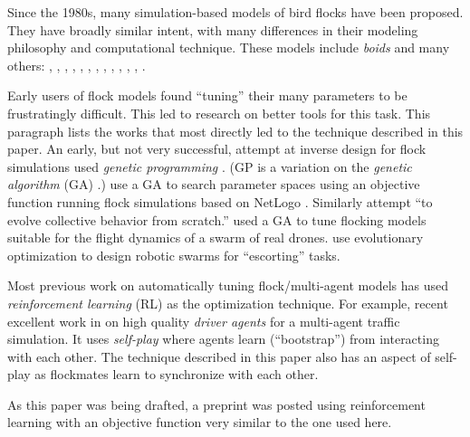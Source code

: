 \documentclass[letterpaper]{article}
\begin{document}
Since the 1980s, many simulation-based models of bird flocks have been proposed. They have broadly similar intent, with many differences in their modeling philosophy and computational technique. These models include \textit{boids} and many others:
\citet{aoki_simulation_1982}, 
\citet{akira_okubo_dynamical_1986}, 
\citet{reynolds_flocks_1987},
\citet{heppner_stochastic_1990}, 
\citet{tu_artificial_1994},
\citet{vicsek_novel_1995},
\citet{toner_flocks_1998}, 
\citet{bajec_simulating_2005},
\citet{cucker_emergent_2007},
\citet{moskon_fuzzy_2007},
\citet{cavagna_seventh_2008},
\citet{bajec_organized_2009},
\citet{bhattacharya_collective_2010}
\citet{vasarhelyi_optimized_2018}
\citet{hoetzlein_flock2_2024}.

Early users of flock models found ``tuning'' their many parameters to be frustratingly difficult. This led to research on better tools for this task. This paragraph lists the works that most directly led to the technique described in this paper. An early, but not very successful, attempt at inverse design for flock simulations \citep{reynolds_evolved_1993} used \textit{genetic programming} \citep{koza_genetic_1992}. (GP is a variation on the \textit{genetic algorithm} (GA) \citep{holland_adaptation_1975}.) \citet{stonedahl_finding_2011} use a GA to search parameter spaces using an objective function running flock simulations based on NetLogo \citep{tisue_netlogo_2004}. Similarly \citet{demsar_evolution_2017} attempt ``to evolve collective behavior from scratch.'' \citet{vasarhelyi_optimized_2018} used a GA to tune flocking models suitable for the flight dynamics of a swarm of real drones. \citet{stolfi_escorting_2025} use evolutionary optimization to design robotic swarms for ``escorting'' tasks.

Most previous work on automatically tuning flock/multi-agent models has used \textit{reinforcement learning} (RL) \citep{sutton_reinforcement_1998} as the optimization technique. For example, recent excellent work in \citet{cornelisse_building_2025} on high quality \textit{driver agents} for a multi-agent traffic simulation. It uses \textit{self-play} where agents learn (``bootstrap'') from interacting with each other. The technique described in this paper also has an aspect of self-play as flockmates learn to synchronize with each other.

As this paper was being drafted, a preprint was posted \citep{brambati_learning_2025} using reinforcement learning with an objective function very similar to the one used here. 
\end{document}
